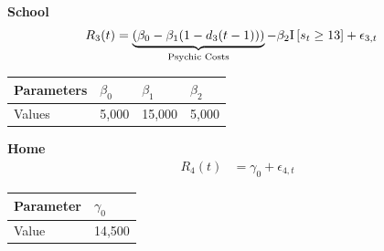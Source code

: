 \begin{frame}\vspace{0.3cm}

\textbf{School}\vspace{0.3cm}
\begin{align*}
R_3(t) & = \underbrace{\left(\beta_0 - \beta_1(1 - d_3(t - 1))\right)}_{\text{Psychic Costs}} - \beta_2\mathbb{\mathrm{I}}\left[s_t \geq 13 \right] + \epsilon_{3,t}
\end{align*}\vspace{-0.5cm}

\begin{center}
\begin{tabular}{L{1.8cm} C{1.2cm} C{1.2cm} C{1.2cm}}\toprule
     Parameters  &  $\beta_{0}$ &  $\beta_{1}$ &  $\beta_{2}$ \\\midrule
     Values  &  5,000  & 15,000 &  5,000 \\\bottomrule
\end{tabular}
\end{center}


\end{frame}
\begin{frame}\vspace{0.3cm}

\textbf{Home}\vspace{0.3cm}
\begin{align*}
R_4(t) & = \gamma_0 + \epsilon_{4,t}
\end{align*}\vspace{-0.5cm}

\begin{center}
\begin{tabular}{L{1.8cm} C{1.1cm}}\toprule
     Parameter &  $\gamma_0$ \\\midrule
     Value      &  14,500     \\\bottomrule
\end{tabular}
\end{center}

\end{frame}
